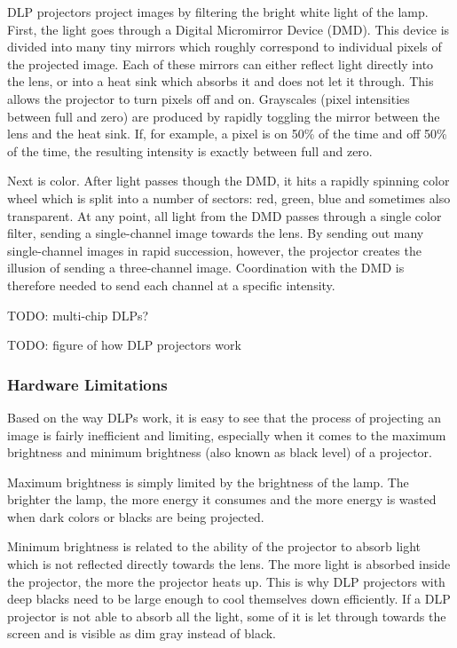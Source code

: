 DLP projectors project images by filtering the bright white light of the lamp. First, the light goes through a Digital Micromirror Device (DMD). This device is divided into many tiny mirrors which roughly correspond to individual pixels of the projected image. Each of these mirrors can either reflect light directly into the lens, or into a heat sink which absorbs it and does not let it through. This allows the projector to turn pixels off and on. Grayscales (pixel intensities between full and zero) are produced by rapidly toggling the mirror between the lens and the heat sink. If, for example, a pixel is on 50\% of the time and off 50\% of the time, the resulting intensity is exactly between full and zero.

Next is color. After light passes though the DMD, it hits a rapidly spinning color wheel which is split into a number of sectors: red, green, blue and sometimes also transparent. At any point, all light from the DMD passes through a single color filter, sending a single-channel image towards the lens. By sending out many single-channel images in rapid succession, however, the projector creates the illusion of sending a three-channel image. Coordination with the DMD is therefore needed to send each channel at a specific intensity.

{\color{red} TODO: multi-chip DLPs?}

{\color{red} TODO: figure of how DLP projectors work}

\subsubsection{Hardware Limitations}
\label{section:background-projection_mapping-projectors-limitations}

Based on the way DLPs work, it is easy to see that the process of projecting an image is fairly inefficient and limiting, especially when it comes to the maximum brightness and minimum brightness (also known as black level) of a projector.

Maximum brightness is simply limited by the brightness of the lamp. The brighter the lamp, the more energy it consumes and the more energy is wasted when dark colors or blacks are being projected.

Minimum brightness is related to the ability of the projector to absorb light which is not reflected directly towards the lens. The more light is absorbed inside the projector, the more the projector heats up. This is why DLP projectors with deep blacks need to be large enough to cool themselves down efficiently. If a DLP projector is not able to absorb all the light, some of it is let through towards the screen and is visible as dim gray instead of black.

